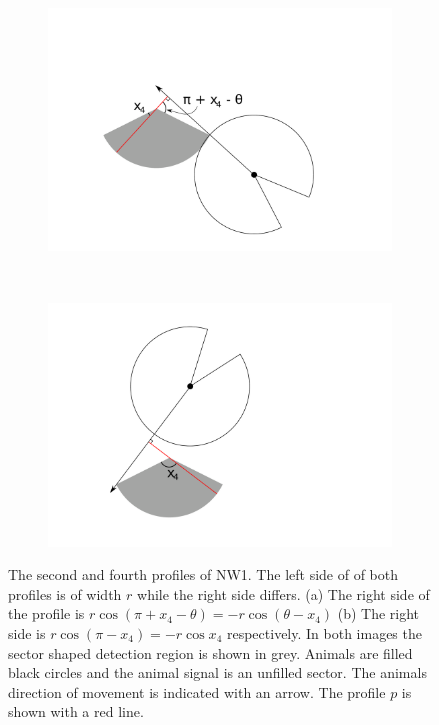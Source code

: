 \begin{figure}[t]
        \centering
        \begin{subfigure}[t]{0.35\textwidth}
                \centering
        \includegraphics[width=1\textwidth, trim=5cm 1cm 4cm 1cm]{imgs/nw2.pdf}
                \caption{}
                \label{f:NW1AT}
        \end{subfigure}
~ 
        \begin{subfigure}[t]{0.35\textwidth}
                \centering
        \includegraphics[width=1\textwidth, trim=0cm 1cm 4cm 1cm]{imgs/nw4.pdf}
                \caption{}
                \label{f:NW1behindFull}
        \end{subfigure}
\caption{The second and fourth profiles of NW1. The left side of of both profiles is of width $r$ while the right side differs. (a) The right side of the profile is $r\cos(\pi+x_4-\theta) = - r\cos(\theta - x_4 )$ (b) The right side is $r\cos(\pi-x_4) = - r\cos x_4$ respectively. In both images the sector shaped detection region is shown in grey. Animals are filled black circles and the animal signal is an unfilled sector. The animals direction of movement is indicated with an arrow. The profile $p$ is shown with a red line. }
\label{f:NW1}
\end{figure}

